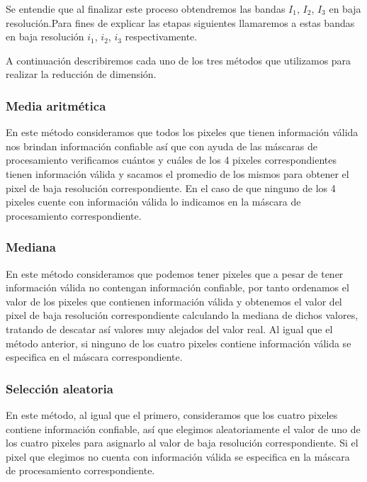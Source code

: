 Se entendie que al finalizar este proceso obtendremos las bandas $I_{1}$, $I_{2}$, $I_{3}$ en baja resolución.Para fines de explicar las etapas siguientes llamaremos a estas bandas en baja resolución $i_{1}$, $i_{2}$, $i_{3}$ respectivamente.

A continuación describiremos cada uno de los tres métodos que utilizamos para realizar la reducción de dimensión.

\subsubsection{Media aritmética}

En este método consideramos que todos los pixeles que tienen información válida nos brindan información confiable así que con ayuda de las máscaras de procesamiento verificamos cuántos y cuáles de los 4 pixeles correspondientes tienen información válida y sacamos el promedio de los mismos para obtener el pixel de baja resolución correspondiente. En el caso de que ninguno de los 4 pixeles cuente con información válida lo indicamos en la máscara de procesamiento correspondiente. 

\subsubsection{Mediana}

En este método consideramos que podemos tener pixeles que a pesar de tener información válida no contengan información confiable, por tanto ordenamos el valor de los pixeles que contienen información válida y obtenemos el valor del pixel de baja resolución correspondiente calculando la mediana de dichos valores, tratando de descatar así valores muy alejados del valor real. Al igual que el método anterior, si ninguno de los cuatro pixeles contiene información válida se especifica en el máscara correspondiente.

\subsubsection{Selección aleatoria}

En este método, al igual que el primero, consideramos que los cuatro pixeles contiene información confiable, así que elegimos aleatoriamente el valor de uno de los cuatro pixeles para asignarlo al valor de baja resolución correspondiente. Si el pixel que elegimos no cuenta con información válida se especifica en la máscara de procesamiento correspondiente.


